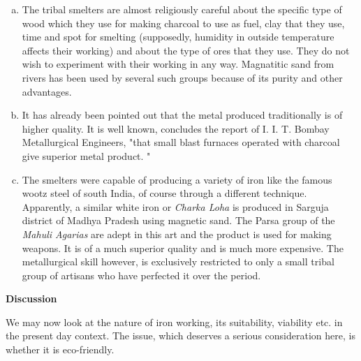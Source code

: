 \begin{enumerate}[a)]
\item The tribal smelters are almost religiously careful about the specific type of wood which they use for making charcoal to use as fuel, clay that they use, time and spot for smelting (supposedly, humidity in outside temperature affects their working) and about the type of ores that they use. They do not wish to experiment with their working in any way. Magnatitic sand from rivers has been used by several such groups because of its purity and other advantages.
\item It has already been pointed out that the metal produced traditionally is of higher quality. It is well known, concludes the report of I. I. T. Bombay Metallurgical Engineers, "that small blast furnaces operated with charcoal give superior metal product. "
\item The smelters were capable of producing a variety of iron like the famous wootz steel of south India, of course through a different technique. Apparently, a similar white iron or {\it Charka Loha} is produced in Sarguja district of Madhya Pradesh using magnetic sand. The Parsa group of the {\it Mahuli Agarias} are adept in this art and the product is used for making weapons. It is of a much superior quality and is much more expensive. The metallurgical skill however, is exclusively restricted to only a small tribal group of artisans who have perfected it over the period.
\end{enumerate}

\noindent \textbf{\large Discussion}

We may now look at the nature of iron working, its suitability, viability etc. in the present day context. The issue, which deserves a serious consideration here, is whether it is eco-friendly.

